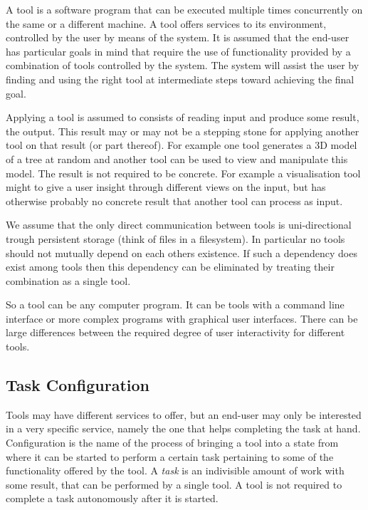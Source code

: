 \documentclass{article}
\begin{document}
   A tool is a software program that can be executed multiple times
   concurrently on the same or a different machine.  A tool offers services to
   its environment, controlled by the user by means of the system. It is
   assumed that the end-user has particular goals in mind that require the use
   of functionality provided by a combination of tools controlled by the
   system. The system will assist the user by finding and using the right tool
   at intermediate steps toward achieving the final goal.

   Applying a tool is assumed to consists of reading input and produce some
   result, the output.  This result may or may not be a stepping stone for
   applying another tool on that result (or part thereof).  For example one
   tool generates a 3D model of a tree at random and another tool can be used
   to view and manipulate this model. The result is not required to be
   concrete. For example a visualisation tool might to give a user insight
   through different views on the input, but has otherwise probably no concrete
   result that another tool can process as input.
   
   We assume that the only direct communication between tools is
   uni-directional trough persistent storage (think of files in a filesystem).
   In particular no tools should not mutually depend on each others existence.
   If such a dependency does exist among tools then this dependency can be
   eliminated by treating their combination as a single tool.

   So a tool can be any computer program. It can be tools with a command line
   interface or more complex programs with graphical user interfaces.  There
   can be large differences between the required degree of user interactivity
   for different tools.

  \subsection{Task Configuration}

   Tools may have different services to offer, but an end-user may only be
   interested in a very specific service, namely the one that helps completing
   the task at hand. Configuration is the name of the process of bringing a
   tool into a state from where it can be started to perform a certain task
   pertaining to some of the functionality offered by the tool. A \textit{task}
   is an indivisible amount of work with some result, that can be performed by
   a single tool.  A tool is not required to complete a task autonomously after
   it is started.
   
\end{document}
